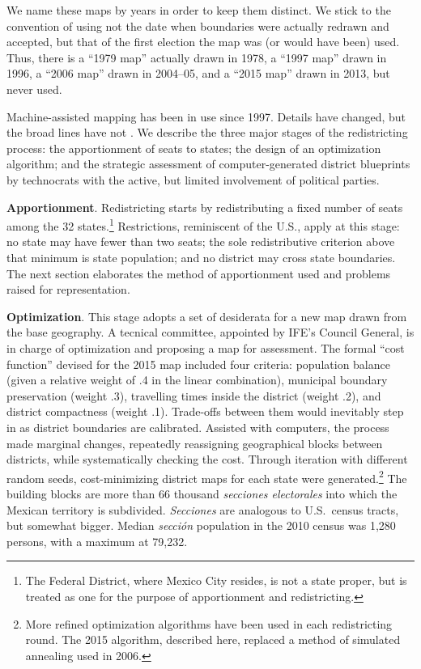 \documentclass[letter,12pt]{article}
\begin{document}
We name these maps by years in order to keep them distinct. We stick to the convention of using not the date when boundaries were actually redrawn and accepted, but that of the first election the map was (or would have been) used. Thus, there is a ``1979 map'' actually drawn in 1978, a ``1997 map'' drawn in 1996, a ``2006 map'' drawn in 2004--05, and a ``2015 map'' drawn in 2013, but never used.

Machine-assisted mapping has been in use since 1997. Details have changed, but the broad lines have not \citep{trelles.mtz.tesisItam.2007}. We describe the three major stages of the redistricting process: the apportionment of seats to states; the design of an optimization algorithm; and the strategic assessment of computer-generated district blueprints by technocrats with the active, but limited involvement of political parties. 

\textbf{Apportionment}. Redistricting starts by redistributing a fixed number of seats among the 32 states.\footnote{The Federal District, where Mexico City resides, is not a state proper, but is treated as one for the purpose of apportionment and redistricting.} Restrictions, reminiscent of the U.S., apply at this stage: no state may have fewer than two seats; the sole redistributive criterion above that minimum is state population; and no district may cross state boundaries. The next section elaborates the method of apportionment used and problems raised for representation. 

\textbf{Optimization}. This stage adopts a set of desiderata for a new map drawn from the base geography. A tecnical committee, appointed by IFE's Council General, is in charge of optimization and proposing a map for assessment. The formal ``cost function'' devised for the 2015 map included four criteria: population balance (given a relative weight of .4 in the linear combination), municipal boundary preservation (weight .3), travelling times inside the district (weight .2), and district compactness (weight .1). Trade-offs between them would inevitably step in as district boundaries are calibrated. Assisted with computers, the process made marginal changes, repeatedly reassigning geographical blocks between districts, while systematically checking the cost. Through iteration with different random seeds, cost-minimizing district maps for each state were generated.\footnote{More refined optimization algorithms have been used in each redistricting round. The 2015 algorithm, described here, replaced a method of simulated annealing used in 2006.} The building blocks are more than 66 thousand \emph{secciones electorales} into which the Mexican territory is subdivided. \emph{Secciones} are analogous to U.S.\ census tracts, but somewhat bigger. Median \emph{secci\'on} population in the 2010 census was 1,280 persons, with a maximum at 79,232. 
\end{document}
